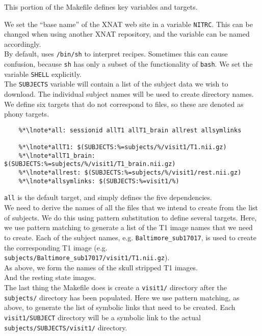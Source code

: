 This portion of the Makefile defines key variables and targets. 

\indent {}We set the ``base name'' of the XNAT web site in a variable \texttt{NITRC}. This can be changed when using another XNAT repository, and the variable can be named accordingly. \\
\indent {} By default, \maken{} uses \texttt{/bin/sh} to interpret recipes. Sometimes this can cause confusion, because \texttt{sh} has only a subset of the functionality of \texttt{bash}. We set the \maken{} variable \texttt{SHELL} explicitly. \\
\indent {}The \texttt{SUBJECTS} variable will contain a list of the subject data we wish to download. The individual subject names will be used to create directory names. \\
\indent {}We define six targets that do not correspond to files, so these are denoted as phony targets.

\begin{lstlisting}
	%*\lnote*all: sessionid allT1 allT1_brain allrest allsymlinks

	%*\lnote*allT1: $(SUBJECTS:%=subjects/%/visit1/T1.nii.gz)
	%*\lnote*allT1_brain: $(SUBJECTS:%=subjects/%/visit1/T1_brain.nii.gz)
	%*\lnote*allrest: $(SUBJECTS:%=subjects/%/visit1/rest.nii.gz)
	%*\lnote*allsymlinks: $(SUBJECTS:%=visit1/%)
\end{lstlisting}

\indent {} \texttt{all} is the default target, and simply defines the five dependencies. \\
\indent {} We need to derive the names of all the files that we
intend to create from the list of subjects. We do this using pattern
substitution to define several targets. Here, we use pattern matching
to generate a list of the T1 image names that we need to create. Each of
the subject names, e.g. \texttt{Baltimore_sub17017}, is used to create
the corresponding T1 image (e.g. \texttt{subjects/Baltimore_sub17017/visit1/T1.nii.gz}).\\
\indent {} As above, we form the names of the skull stripped T1 images.\\
\indent {} And the resting state images.\\
\indent {} The last thing the Makefile does is create a
\texttt{visit1/} directory after the \texttt{subjects/} directory has
been populated. Here we use pattern matching, as above, to generate
the list of symbolic links that need to be created.  Each
\texttt{visit1/SUBJECT} directory will be a symbolic link to the actual \texttt{subjects/SUBJECTS/visit1/} directory.


